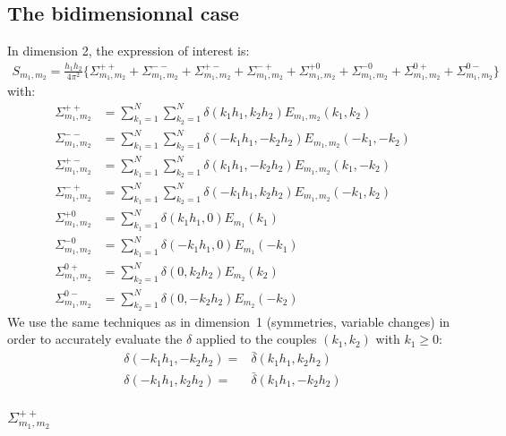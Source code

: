 \subsection{The bidimensionnal case}
In dimension 2, the expression of interest is:
\begin{align}
S_{m_1,m_2}=\frac{h_1h_2}{4\pi^2}\Big\{
  \Sigma_{m_1,m_2}^{++} + \Sigma_{m_1,m_2}^{--} + \Sigma_{m_1,m_2}^{+-} + \Sigma_{m_1,m_2}^{-+} +
  \Sigma_{m_1,m_2}^{+0} + \Sigma_{m_1,m_2}^{-0} + \Sigma_{m_1,m_2}^{0+} + \Sigma_{m_1,m_2}^{0-}
\Big\}
\end{align}
with:
\begin{align}
\Sigma_{m_1,m_2}^{++}&=\sum_{k_1=1}^{N}\sum_{k_2=1}^{N}\delta\left(k_1h_1,k_2h_2\right)E_{m_1,m_2}(k_1,k_2)\\
\Sigma_{m_1,m_2}^{--}&=\sum_{k_1=1}^{N}\sum_{k_2=1}^{N}\delta\left(-k_1h_1,-k_2h_2\right)E_{m_1,m_2}(-k_1,-k_2)\\
\Sigma_{m_1,m_2}^{+-}&=\sum_{k_1=1}^{N}\sum_{k_2=1}^{N}\delta\left(k_1h_1,-k_2h_2\right)E_{m_1,m_2}(k_1,-k_2)\\
\Sigma_{m_1,m_2}^{-+}&=\sum_{k_1=1}^{N}\sum_{k_2=1}^{N}\delta\left(-k_1h_1,k_2h_2\right)E_{m_1,m_2}(-k_1,k_2)\\
\Sigma_{m_1,m_2}^{+0}&=\sum_{k_1=1}^{N}\delta(k_1h_1,0)E_{m_1}(k_1)\\
\Sigma_{m_1,m_2}^{-0}&=\sum_{k_1=1}^{N}\delta(-k_1h_1,0)E_{m_1}(-k_1)\\
\Sigma_{m_1,m_2}^{0+}&=\sum_{k_2=1}^{N}\delta(0,k_2h_2)E_{m_2}(k_2)\\
\Sigma_{m_1,m_2}^{0-}&=\sum_{k_2=1}^{N}\delta(0,-k_2h_2)E_{m_2}(-k_2)
\end{align}
We use the same techniques as in dimension~1 (symmetries, variable changes) in order to accurately evaluate the $\delta$ applied to the couples $(k_1, k_2)$ with $k_1\geq 0$:
\begin{align}
\delta\left(-k_1h_1,-k_2h_2\right)=&\bar{\delta}\left(k_1h_1,k_2h_2\right)\\
\delta\left(-k_1h_1, k_2h_2\right)=&\bar{\delta}\left(k_1h_1,-k_2h_2\right)
\end{align}

\subsubsection{$\Sigma_{m_1,m_2}^{++}$}

